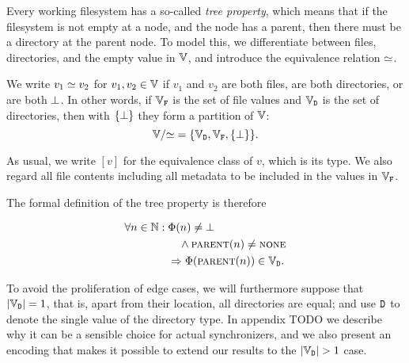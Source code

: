 Every working filesystem has a so-called \emph{tree property}, which means that
if the filesystem is not empty at a node, and the node has a parent,
then there must be a directory at the parent node.
To model this, we differentiate between files, directories, and the
empty value in $\mathbb{V}$, and introduce the equivalence relation
$\simeq$.

\begin{mydef}
We write $v_1\simeq v_2$ for $v_1,v_2\in\mathbb{V}$ if $v_1$ and $v_2$ are both files,
are both directories, or are both $\bot$.
In other words, if $\mathbb{V}_{\mathtt{F}}$ is the set of file values and $\mathbb{V}_{\mathtt{D}}$ is the set of directories, then
with $\{\bot\}$ they form a partition of $\mathbb{V}$:
\[ \mathbb{V}/{\simeq} = \{\mathbb{V}_{\mathtt{D}},\mathbb{V}_{\mathtt{F}},\{\bot\}\}. \]
\end{mydef}

As usual, we write $[v]$ for the equivalence class of $v$, which is its type.
We also regard all file contents including all metadata to be included in the values in $\mathbb{V}_{\mathtt{F}}$.

The formal definition of the tree property is therefore
\begin{mydef}
\begin{align*}
\forall n\in\mathbb{N}:{} &\Phi(n) \neq \bot \\
&\quad\wedge \text{\normalfont\scshape{parent}}(n) \neq \text{\normalfont\scshape{none}} \\
&\Rightarrow \Phi(\text{\normalfont\scshape{parent}}(n)) \in \mathbb{V}_{\mathtt{D}}. 
\end{align*}
\end{mydef}

To avoid the proliferation of edge cases, we will furthermore suppose that
$|\mathbb{V}_{\mathtt{D}}|=1$, that is, apart from their location, all directories are equal;
and use $\mathtt{D}$ to denote the single value of the directory type.
In appendix TODO we describe why it can be a sensible choice
for actual synchronizers, and we also present an encoding that makes it possible
to extend our results to the $|\setd|>1$ case.



